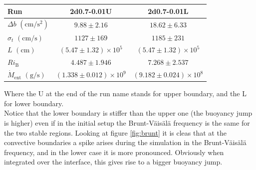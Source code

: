 \begin{center}
 \begin{tabular}{l|c|c}
	 Run &2d0.7-0.01U&2d0.7-0.01L\\
	  	\hline
	   $\Delta b$ $(\mathrm{cm/s^{2}})$&$ 9.88 \pm 2.16 $&$18.62 \pm 6.33$\\
		\hline
	   $\sigma_t$ $(\mathrm{cm/s})$ &$ 1127 \pm 169 $&$1185 \pm 231$\\
		\hline
	   $L$ $(\mathrm{cm})$&$(5.47 \pm 1.32) \times 10^5$&$(5.47 \pm 1.32) \times 10^5$\\
		\hline
	   $Ri_{\mathrm{B}}$& $4.487 \pm 1.946 $&$7.268 \pm 2.537$\\
		\hline
	   $\dot{M}_{\mathrm{ent}}$ $(\mathrm{g/s})$ &$(1.338 \pm 0.012) \times 10^9$&$(9.182 \pm 0.024) \times 10^8$\\
      \end{tabular}
 \end{center}
 Where the U at the end of the run name stands for upper boundary, and the L for lower boundary. \\
 Notice that the lower boundary is stiffer than the upper one (the buoyancy jump is higher) even if in the initial setup the Brunt-Väisälä frequency is the same for the two stable regions. Looking at figure \ref{fig:brunt} it is cleas that at the convective boundaries a spike arises during the simulation in the Brunt-Väisälä frequency, and in the lower case it is more pronounced. Obviously when integrated over the interface, this gives rise to a bigger buoyancy jump.


